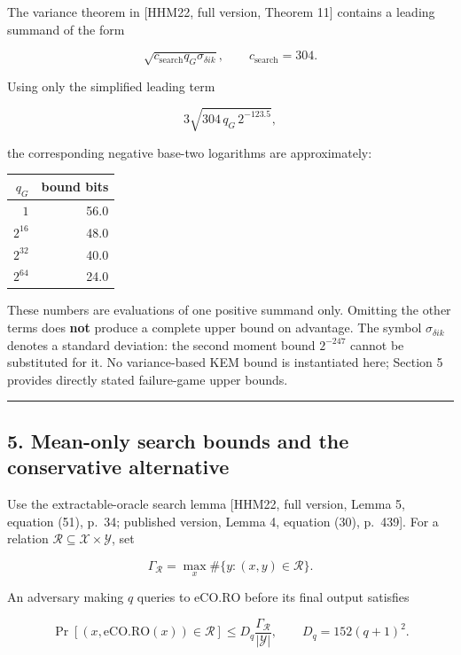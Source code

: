 \documentclass[11pt,a4paper]{article}
\begin{document}
The variance theorem in {[}HHM22, full version, Theorem 11{]} contains a leading summand of the form

\[
\sqrt{c_{\mathrm{search}}q_G\sigma_{\delta ik}},
\qquad c_{\mathrm{search}}=304.
\]

Using only the simplified leading term

\[
3\sqrt{304\,q_G\,2^{-123.5}},
\]

the corresponding negative base-two logarithms are approximately:

\begin{longtable}[]{@{}rr@{}}
\toprule\noalign{}
\(q_G\) & bound bits \\
\midrule\noalign{}
\endhead
\bottomrule\noalign{}
\endlastfoot
\(1\) & 56.0 \\
\(2^{16}\) & 48.0 \\
\(2^{32}\) & 40.0 \\
\(2^{64}\) & 24.0 \\
\end{longtable}

These numbers are evaluations of one positive summand only. Omitting the other terms does \textbf{not} produce a complete upper bound on advantage. The symbol \(\sigma_{\delta ik}\) denotes a standard deviation: the second moment bound \(2^{-247}\) cannot be substituted for it. No variance-based KEM bound is instantiated here; Section 5 provides directly stated failure-game upper bounds.

\begin{center}\rule{0.5\linewidth}{0.5pt}\end{center}

\subsection{5. Mean-only search bounds and the conservative alternative}\label{mean-only-search-bounds-and-the-conservative-alternative}

Use the extractable-oracle search lemma {[}HHM22, full version, Lemma 5, equation (51), p.~34; published version, Lemma 4, equation (30), p.~439{]}. For a relation \(\mathcal R\subseteq\mathcal X\times\mathcal Y\), set

\[
\Gamma_{\mathcal R}=\max_x\#\{y:(x,y)\in\mathcal R\}.
\]

An adversary making \(q\) queries to \(\mathrm{eCO.RO}\) before its final output satisfies

\[
\Pr[(x,\mathrm{eCO.RO}(x))\in\mathcal R]
\le D_q\frac{\Gamma_{\mathcal R}}{|\mathcal Y|},
\qquad D_q=152(q+1)^2.
\]
\end{document}
